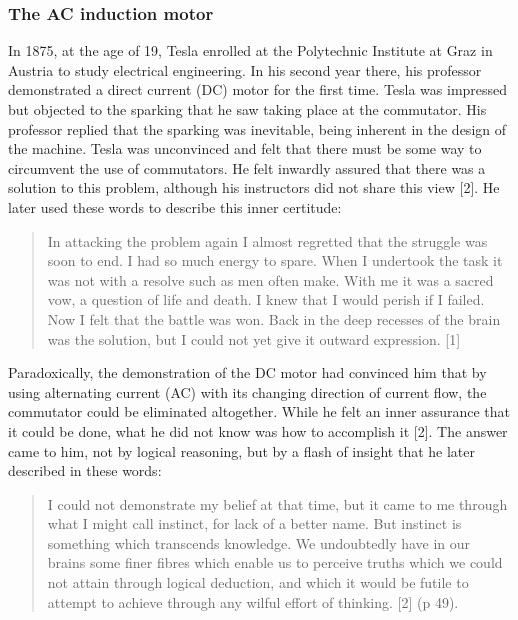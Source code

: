 \documentclass[
  12pt,
  british,
  a4paper,
]{article}
\begin{document}
\hypertarget{the-ac-induction-motor}{%
\subsubsection{The AC induction motor}\label{the-ac-induction-motor}}

In 1875, at the age of 19, Tesla enrolled at the Polytechnic Institute
at Graz in Austria to study electrical engineering. In his second year
there, his professor demonstrated a direct current (DC) motor for the
first time. Tesla was impressed but objected to the sparking that he saw
taking place at the commutator. His professor replied that the sparking
was inevitable, being inherent in the design of the machine. Tesla was
unconvinced and felt that there must be some way to circumvent the use
of commutators. He felt inwardly assured that there was a solution to
this problem, although his instructors did not share this view {[}2{]}.
He later used these words to describe this inner certitude:

\begin{quote}
In attacking the problem again I almost regretted that the struggle was
soon to end. I had so much energy to spare. When I undertook the task it
was not with a resolve such as men often make. With me it was a sacred
vow, a question of life and death. I knew that I would perish if I
failed. Now I felt that the battle was won. Back in the deep recesses of
the brain was the solution, but I could not yet give it outward
expression. {[}1{]}
\end{quote}

Paradoxically, the demonstration of the DC motor had convinced him that
by using alternating current (AC) with its changing direction of current
flow, the commutator could be eliminated altogether. While he felt an
inner assurance that it could be done, what he did not know was how to
accomplish it {[}2{]}. The answer came to him, not by logical reasoning,
but by a flash of insight that he later described in these words:

\begin{quote}
I could not demonstrate my belief at that time, but it came to me
through what I might call instinct, for lack of a better name. But
instinct is something which transcends knowledge. We undoubtedly have in
our brains some finer fibres which enable us to perceive truths which we
could not attain through logical deduction, and which it would be futile
to attempt to achieve through any wilful effort of thinking. {[}2{]} (p
49).
\end{quote}
\end{document}
